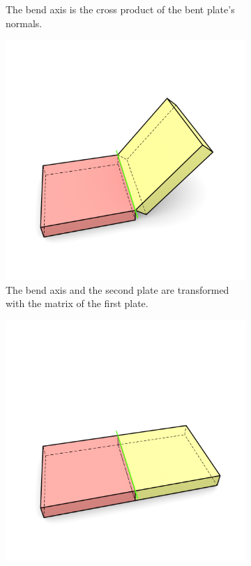 \documentclass[../ClassicThesis.tex]{subfiles}
\begin{document}
\begin{figure}[h]
\begin{subfigure}[b]{0.49\textwidth}
    \caption{The bend axis is the cross product of the bent plate's normals.}
    \label{fig:bend-matrix:4}
  \end{subfigure}
  \begin{subfigure}[b]{0.49\textwidth}
    \centering
    \includegraphics[width=\textwidth]{07-traversing_along_bend_connections_08}
    \caption{The bend axis and the second plate are transformed with the matrix of the first plate.}
    \label{fig:bend-matrix:5}
  \end{subfigure}
  \begin{subfigure}[b]{0.49\textwidth}
    \centering
    \includegraphics[width=1\textwidth]{07-traversing_along_bend_connections_07}

\end{subfigure}
\end{figure}
\end{document}
